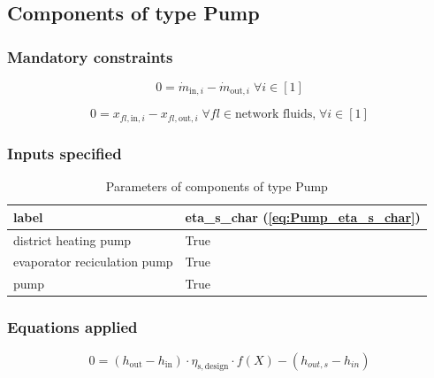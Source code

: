 \subsection{Components of type Pump}

\subsubsection{Mandatory constraints}

\begin{equation}
\label{eq:Pump_mass_flow_constraints}
0=\dot{m}_{\mathrm{in,}i}-\dot{m}_{\mathrm{out,}i}\; \forall i \in [1]
\end{equation}

\begin{equation}
\label{eq:Pump_fluid_constraints}
0=x_{fl\mathrm{,in,}i}-x_{fl\mathrm{,out,}i}\;\forall fl \in\text{network fluids,}\; \forall i \in [1]
\end{equation}


\subsubsection{Inputs specified}

\begin{table}[H]\begin{center}
\begin{tabular}{ll}
\toprule
                        label &  eta\_s\_char (\ref{eq:Pump_eta_s_char}) \\
\midrule
        district heating pump &                                     True \\
 evaporator reciculation pump &                                     True \\
                         pump &                                     True \\
\bottomrule
\end{tabular}
\caption{Parameters of components of type Pump}
\end{center}\end{table}

\subsubsection{Equations applied}

\begin{equation}
\label{eq:Pump_eta_s_char}
0=\left(h_\mathrm{out}-h_\mathrm{in}\right)\cdot\eta_\mathrm{s,design}\cdot f\left( X \right)-\left( h_{out,s} - h_{in} \right)
\end{equation}


